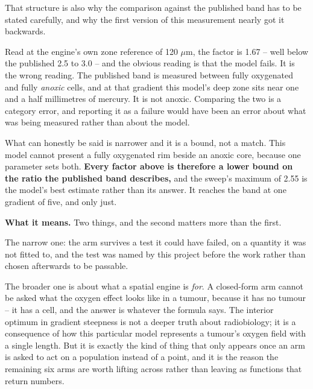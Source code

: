 \documentclass[11pt,twoside,openright]{report}
\begin{document}
\begin{refusal}
That structure is also why the comparison against the published band has to be stated carefully, and why the first version of this measurement nearly got it backwards.

Read at the engine's own zone reference of 120 $\mu$m, the factor is 1.67 -- well below the published 2.5 to 3.0 -- and the obvious reading is that the model fails. It is the wrong reading. The published band is measured between fully oxygenated and fully \textit{anoxic} cells, and at that gradient this model's deep zone sits near one and a half millimetres of mercury. It is not anoxic. Comparing the two is a category error, and reporting it as a failure would have been an error about what was being measured rather than about the model.

What can honestly be said is narrower and it is a bound, not a match. This model cannot present a fully oxygenated rim beside an anoxic core, because one parameter sets both. \textbf{Every factor above is therefore a lower bound on the ratio the published band describes,} and the sweep's maximum of 2.55 is the model's best estimate rather than its answer. It reaches the band at one gradient of five, and only just.
\end{refusal}

\textbf{What it means.} Two things, and the second matters more than the first.

The narrow one: the arm survives a test it could have failed, on a quantity it was not fitted to, and the test was named by this project before the work rather than chosen afterwards to be passable.

The broader one is about what a spatial engine is \textit{for}. A closed-form arm cannot be asked what the oxygen effect looks like in a tumour, because it has no tumour -- it has a cell, and the answer is whatever the formula says. The interior optimum in gradient steepness is not a deeper truth about radiobiology; it is a consequence of how this particular model represents a tumour's oxygen field with a single length. But it is exactly the kind of thing that only appears once an arm is asked to act on a population instead of a point, and it is the reason the remaining six arms are worth lifting across rather than leaving as functions that return numbers.
\end{document}
